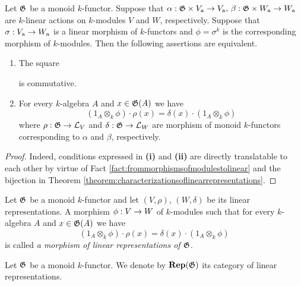 \begin{proposition}\label{proposition:characterization_of_morphism_of_linear_representations}
Let ${\mathfrak G}$ be a monoid $k$-functor. Suppose that $\alpha:{\mathfrak G}\times V_{\mathrm{a}}\rightarrow V_{\mathrm{a}},\,\beta:{\mathfrak G}\times W_{\mathrm{a}}\rightarrow W_{\mathrm{a}}$ are $k$-linear actions on $k$-modules $V$ and $W$, respectively. Suppose that $\sigma:V_{\mathrm{a}}\rightarrow W_{\mathrm{a}}$ is a linear morphism of $k$-functors and $\phi = \sigma^k$ is the corresponding morphism of $k$-modules. Then the following assertions are equivalent.
\begin{enumerate}[label=\emph{\textbf{(\roman*)}}, leftmargin=3.0em]
\item The square
\begin{center}
\end{center}
is commutative.
\item For every $k$-algebra $A$ and $x\in {\mathfrak G}(A)$ we have
$$\left(1_A\otimes_k\phi\right)\cdot \rho(x) = \delta(x) \cdot \left(1_A\otimes_k\phi\right)$$
where $\rho:{\mathfrak G}\rightarrow {\mathcal L}_V$ and $\delta:{\mathfrak G}\rightarrow {\mathcal L}_W$ are morphism of monoid $k$-functors corresponding to $\alpha$ and $\beta$, respectively.
\end{enumerate}
\end{proposition}
\begin{proof}
Indeed, conditions expressed in \textbf{(i)} and \textbf{(ii)} are directly translatable to each other by virtue of Fact \ref{fact:frommorphismsofmodulestolinear} and the bijection in Theorem \ref{theorem:characterizationsoflinearrepresentations}. 
\end{proof}

\begin{definition}
Let ${\mathfrak G}$ be a monoid $k$-functor and let $(V,\rho)$, $(W,\delta)$ be its linear representations. A morphism $\phi:V\rightarrow W$ of $k$-modules such that for every $k$-algebra $A$ and $x\in {\mathfrak G}(A)$ we have
$$\left(1_A\otimes_k\phi\right)\cdot \rho(x) = \delta(x) \cdot \left(1_A\otimes_k\phi\right)$$
is called \textit{a morphism of linear representations of ${\mathfrak G}$}.
\end{definition}
\noindent
Let ${\mathfrak G}$ be a monoid $k$-functor. We denote by $\mathbf{Rep}({\mathfrak G})$ its category of linear representations.

